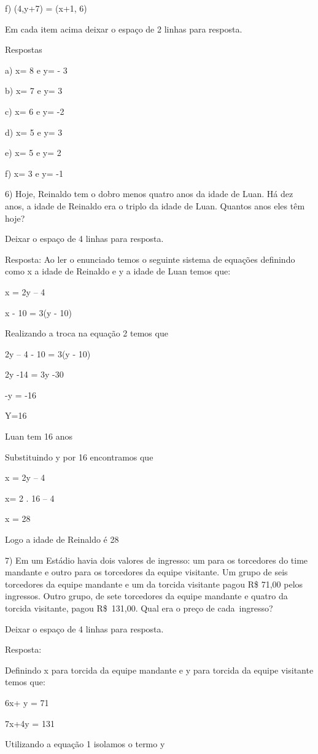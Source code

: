 f) (4,y+7) = (x+1, 6)

Em cada item acima deixar o espaço de 2 linhas para resposta.

Respostas

a) x= 8 e y= - 3

b) x= 7 e y= 3

c) x= 6 e y= -2

d) x= 5 e y= 3

e) x= 5 e y= 2

f) x= 3 e y= -1

6) Hoje, Reinaldo tem o dobro menos quatro anos da idade de Luan. Há dez
anos, a idade de Reinaldo era o triplo da idade de Luan. Quantos anos
eles têm hoje?

Deixar o espaço de 4 linhas para resposta.

Resposta: Ao ler o enunciado temos o seguinte sistema de equações
definindo como x a idade de Reinaldo e y a idade de Luan temos que:

x = 2y -- 4

x - 10 = 3(y - 10)

Realizando a troca na equação 2 temos que

2y -- 4 - 10 = 3(y - 10)

2y -14 = 3y -30

-y = -16

Y=16

Luan tem 16 anos

Substituindo y por 16 encontramos que

x = 2y -- 4

x= 2 . 16 -- 4

x = 28

Logo a idade de Reinaldo é 28

7) Em um Estádio havia dois valores de ingresso: um para os torcedores
do time mandante e outro para os torcedores da equipe visitante. Um
grupo de seis torcedores da equipe mandante e um da torcida visitante
pagou R\$ 71,00 pelos ingressos. Outro grupo, de sete torcedores da
equipe mandante e quatro da torcida visitante, pagou R\$~131,00. Qual
era o preço de cada~ingresso?

Deixar o espaço de 4 linhas para resposta.

Resposta:

Definindo x para torcida da equipe mandante e y para torcida da equipe
visitante temos que:

6x+ y = 71

7x+4y = 131

Utilizando a equação 1 isolamos o termo y

